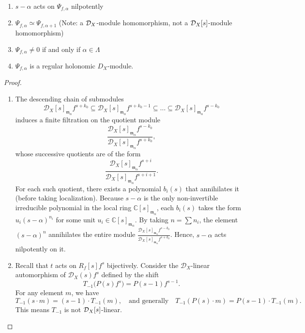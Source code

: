 \begin{proposition}\label{prop:properties_of_alpha_nearby_cycles}
    \quad

    \begin{enumerate}
        \item $s - \alpha$ acts on $\Psi_{f,\alpha}$ nilpotently
        \item $\Psi_{f,\alpha} \simeq \Psi_{f,\alpha+1}$ (Note: a $\mathcal{D}_X$-module homomorphism, not a $\mathcal{D}_X[s]$-module homomorphism)
        \item $\Psi_{f,\alpha} \neq 0$ if and only if $\alpha \in \Lambda$
        \item $\Psi_{f,\alpha}$ is a regular holonomic $D_X$-module.
    \end{enumerate}
\end{proposition}
\begin{proof}
    \mbox{}

    \begin{enumerate}
        \item The descending chain of submodules
              \[
                  \mathcal{D}_{X}[s]_{\mathfrak{m}_{\alpha}}f^{s+k_{0}}\subseteq\mathcal{D}_{X}[s]_{\mathfrak{m}_{\alpha}}f^{s+k_{0}-1}\subseteq\dots\subseteq \mathcal{D}_{X}[s]_{\mathfrak{m}_{\alpha}}f^{s-k_{0}}
              \]
              induces a finite filtration on the quotient module
              \[
                  \frac{\mathcal{D}_{X}[s]_{\mathfrak{m}_{\alpha}}f^{s-k_{0}}}{\mathcal{D}_{X}[s]_{\mathfrak{m}_{\alpha}}f^{s+k_{0}}},
              \]
              whose successive quotients are of the form
              \[
                  \frac{\mathcal{D}_{X}[s]_{\mathfrak{m}_{\alpha}}f^{s+i}}{\mathcal{D}_{X}[s]_{\mathfrak{m}_{\alpha}}f^{s+i+1}}.
              \]
              For each such quotient, there exists a polynomial $b_{i}(s)$ that annihilates it (before taking localization). Because $s-\alpha$ is the only non-invertible irreducible polynomial in the local ring $\mathbb{C}[s]_{\mathfrak{m}_{\alpha}}$, each $b_{i}(s)$ takes the form $u_{i}(s-\alpha)^{n_{i}}$ for some unit $u_{i} \in \mathbb{C}[s]_{\mathfrak{m}_{\alpha}}$.
              By taking $n = \sum n_{i}$, the element $(s-\alpha)^{n}$ annihilates the entire module $\frac{\mathcal{D}_{X}[s]_{\mathfrak{m}_{\alpha}}f^{s-k_{0}}}{\mathcal{D}_{X}[s]_{\mathfrak{m}_{\alpha}}f^{s+k_{0}}}$. Hence, $s-\alpha$ acts nilpotently on it.

        \item Recall that $t$ acts on $R_f[s]f^s$ bijectively. Consider the $\mathcal{D}_{X}$-linear automorphism of $\mathcal{D}_{X}(s)f^{s}$ defined by the shift
              \[
                  T_{-1}\big(P(s)f^{s}\big) = P(s-1)f^{s-1}.
              \]
              For any element $m$, we have
              \[
                  T_{-1}(s \cdot m) = (s-1) \cdot T_{-1}(m), \quad\text{and generally}\quad T_{-1}(P(s) \cdot m) = P(s-1) \cdot T_{-1}(m).
              \]
              This means $T_{-1}$ is not $\mathcal{D}_X[s]$-linear.


\end{enumerate}
\end{proof}
